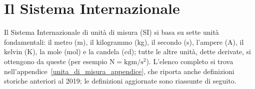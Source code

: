 
\section[Il Sistema Internazionale]{Il Sistema Internazionale}
Il Sistema Internazionale di unità di misura (SI) si basa su sette unità fondamentali: il metro (\si{\meter}), il kilogrammo (\si{\kilogram}), il secondo (\si{\second}), l'ampere (\si{\ampere}), il kelvin (\si{\kelvin}), la mole (\si{\mole}) e la candela (\si{\candela}); tutte le altre unità, dette derivate, si ottengono da queste (per esempio $\si{\newton}=\si{\kilogram\meter\per\second\squared}$). L'elenco completo si trova nell'appendice~\ref{unita_di_misura_appendice}, che riporta anche definizioni storiche anteriori al 2019; le definizioni aggiornate sono riassunte di seguito.

